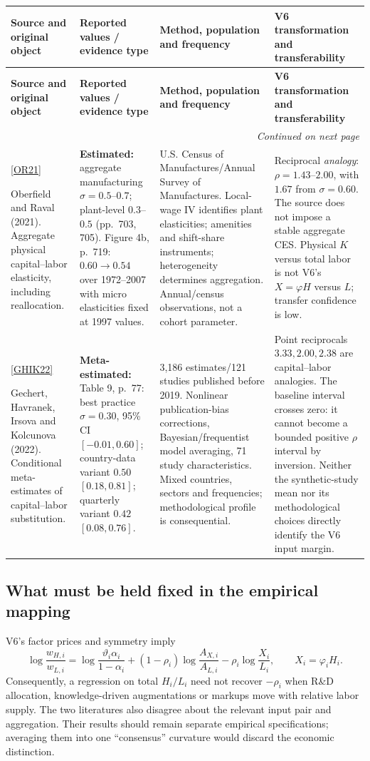 \documentclass[10pt,a4paper,landscape]{article}
\makeatletter
\newcommand{\src}[1]{\hyperlink{ref:#1}{\textsf{[#1]}}}
\newenvironment{evidence}{%
\fontsize{9.4}{10.9}\selectfont\setlength{\parskip}{2pt}
\begin{longtable}{@{}P{\dimexpr .22\textwidth-7.5pt\relax}P{\dimexpr .24\textwidth-7.5pt\relax}P{\dimexpr .25\textwidth-7.5pt\relax}P{\dimexpr .29\textwidth-7.5pt\relax}@{}}
\toprule\rowcolor{tablehead}\textbf{Source and original object} & \textbf{Reported values / evidence type} & \textbf{Method, population and frequency} & \textbf{V6 transformation and transferability}\\\midrule
\endfirsthead
\toprule\rowcolor{tablehead}\textbf{Source and original object} & \textbf{Reported values / evidence type} & \textbf{Method, population and frequency} & \textbf{V6 transformation and transferability}\\\midrule
\endhead
\midrule\multicolumn{4}{r}{\footnotesize\itshape Continued on next page}\\\endfoot
\bottomrule\endlastfoot
}{\end{longtable}}
\makeatother
\begin{document}
\begin{evidence}
\src{OR21}\par Oberfield and Raval (2021). Aggregate physical capital--labor elasticity, including reallocation.
& \textbf{Estimated:} aggregate manufacturing $\sigma=0.5$--$0.7$; plant-level $0.3$--$0.5$ (pp.\ 703, 705). Figure 4b, p.\ 719: $0.60\to0.54$ over 1972--2007 with micro elasticities fixed at 1997 values.
& U.S. Census of Manufactures/Annual Survey of Manufactures. Local-wage IV identifies plant elasticities; amenities and shift-share instruments; heterogeneity determines aggregation. Annual/census observations, not a cohort parameter.
& Reciprocal \emph{analogy}: $\rho=1.43$--$2.00$, with $1.67$ from $\sigma=0.60$. The source does not impose a stable aggregate CES. Physical $K$ versus total labor is not V6's $X=\varphi H$ versus $L$; transfer confidence is low.\\[4pt]

\src{GHIK22}\par Gechert, Havranek, Irsova and Kolcunova (2022). Conditional meta-estimates of capital--labor substitution.
& \textbf{Meta-estimated:} Table 9, p.\ 77: best practice $\sigma=0.30$, 95\% CI $[-0.01,0.60]$; country-data variant $0.50$ $[0.18,0.81]$; quarterly variant $0.42$ $[0.08,0.76]$.
& 3,186 estimates/121 studies published before 2019. Nonlinear publication-bias corrections, Bayesian/frequentist model averaging, 71 study characteristics. Mixed countries, sectors and frequencies; methodological profile is consequential.
& Point reciprocals $3.33,2.00,2.38$ are capital--labor analogies. The baseline interval crosses zero: it cannot become a bounded positive $\rho$ interval by inversion. Neither the synthetic-study mean nor its methodological choices directly identify the V6 input margin.\\[4pt]
\end{evidence}

\subsection{What must be held fixed in the empirical mapping}
V6's factor prices and symmetry imply
\[
\log\frac{w_{H,i}}{w_{L,i}}
=\log\frac{\vartheta_i\alpha_i}{1-\alpha_i}
+(1-\rho_i)\log\frac{A_{X,i}}{A_{L,i}}
-\rho_i\log\frac{X_i}{L_i},\qquad X_i=\varphi_iH_i.
\]
Consequently, a regression on total $H_i/L_i$ need not recover $-\rho_i$ when R\&D allocation, knowledge-driven augmentations or markups move with relative labor supply. The two literatures also disagree about the relevant input pair and aggregation. Their results should remain separate empirical specifications; averaging them into one ``consensus'' curvature would discard the economic distinction.
\end{document}
